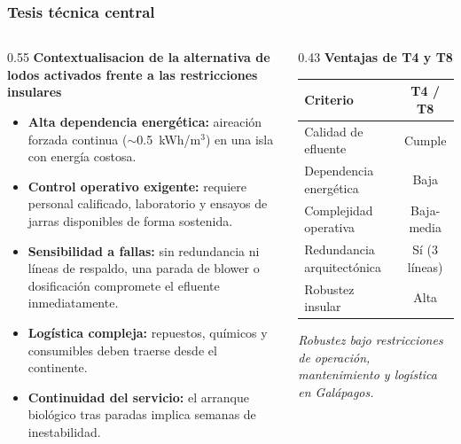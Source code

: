 \documentclass[aspectratio=169]{beamer}
\begin{document}
\begin{frame}
\frametitle{Tesis t\'{e}cnica central}
\begin{columns}[T]
\begin{column}{0.55\textwidth}
\footnotesize
\textbf{Contextualisacion de la alternativa de  lodos activados frente a las restricciones insulares}\\[4pt]

\scriptsize
\begin{itemize}
\item \textbf{Alta dependencia energ\'{e}tica:} aireaci\'{o}n forzada continua ($\sim$0.5~kWh/m$^3$) en una isla con energ\'{i}a costosa.
\item \textbf{Control operativo exigente:} requiere personal calificado, laboratorio y ensayos de jarras disponibles de forma sostenida.
\item \textbf{Sensibilidad a fallas:} sin redundancia ni l\'{i}neas de respaldo, una parada de blower o dosificaci\'{o}n compromete el efluente inmediatamente.
\item \textbf{Log\'{i}stica compleja:} repuestos, qu\'{i}micos y consumibles deben traerse desde el continente.
\item \textbf{Continuidad del servicio:} el arranque biol\'{o}gico tras paradas implica semanas de inestabilidad.
\end{itemize}
\end{column}
\begin{column}{0.43\textwidth}
\footnotesize
\textbf{Ventajas  de T4 y T8}\\[4pt]
\scriptsize


\vspace{4pt}
\renewcommand{\arraystretch}{1.1}
\begin{tabular}{p{3.2cm}c}
\toprule
Criterio & T4 / T8 \\
\midrule
Calidad de efluente & Cumple \\
Dependencia energ\'{e}tica & Baja \\
Complejidad operativa & Baja-media \\
Redundancia arquitect\'{o}nica & S\'{i} (3 l\'{i}neas) \\
Robustez insular & Alta \\
\bottomrule
\end{tabular}

\vspace{4pt}
\scriptsize
\textit{Robustez bajo restricciones  de operaci\'{o}n, mantenimiento y log\'{i}stica en Gal\'{a}pagos.}
\end{column}
\end{columns}
\end{frame}
\end{document}
